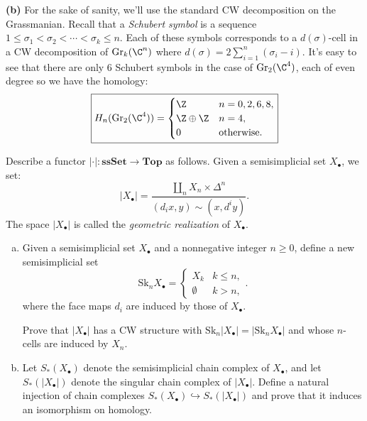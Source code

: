 \documentclass[11pt,letterpaper]{article}
\begin{document}
\begin{solution}
    \textbf{(b)} For the sake of sanity, we'll use the standard CW decomposition on the Grassmanian. Recall that a \emph{Schubert symbol} is a sequence $1\leq \sigma_1 < \sigma_2 < \cdots < \sigma_k \leq n$. Each of these symbols corresponds to a $d(\sigma)$-cell in a CW decomposition of $\text{Gr}_k(\C^n)$ where $d(\sigma)=2\sum^n_{i=1}(\sigma_i - i)$. It's easy to see that there are only $6$ Schubert symbols in the case of $\text{Gr}_2(\C^4)$, each of even degree so we have the homology:
    \[
        \boxed{H_n(\text{Gr}_2(\C^4))=\begin{cases}
            \Z & n=0,2,6,8,\\
            \Z\oplus \Z & n =4,\\
            0 & \text{otherwise}.
        \end{cases}}
    \] 
\end{solution}

\begin{problem}
    Describe a functor $|\cdot | : \mathbf{ssSet} \to \mathbf{Top}$ as follows. Given a semisimplicial set $X_\bullet$, we set:
    \[
        |X_\bullet| = \frac{\coprod_n X_n\times \Delta^n}{(d_ix,y)\sim (x, d^iy)}
    .\]  
    The space $|X_\bullet|$ is called the \emph{geometric realization} of $X_\bullet$.
    \begin{enumerate}[(a)]
        \item Given a semisimplicial set $X_\bullet$ and a nonnegative integer $n\geq 0$, define a new semisimplicial set
        \[
            \text{Sk}_n X_\bullet = \begin{cases}
                X_k & k\leq n,\\
                \emptyset & k >n,
            \end{cases}    
        .\] 
        where the face maps $d_i$ are induced by those of $X_\bullet$.

        \quad Prove that $|X_\bullet|$ has a CW structure with $\text{Sk}_n|X_\bullet|=|\text{Sk}_n X_\bullet|$ and whose $n$-cells are induced by $X_n$. 

        \item Let $S_*(X_\bullet)$ denote the semisimplicial chain complex of $X_\bullet$, and let $S_*(|X_\bullet|)$ denote the singular chain complex of $|X_\bullet|$. Define a natural injection of chain complexes $S_*(X_\bullet) \hookrightarrow S_*(|X_{\bullet}|)$ and prove that it induces an isomorphism on homology.
    \end{enumerate}
\end{problem}
\end{document}
